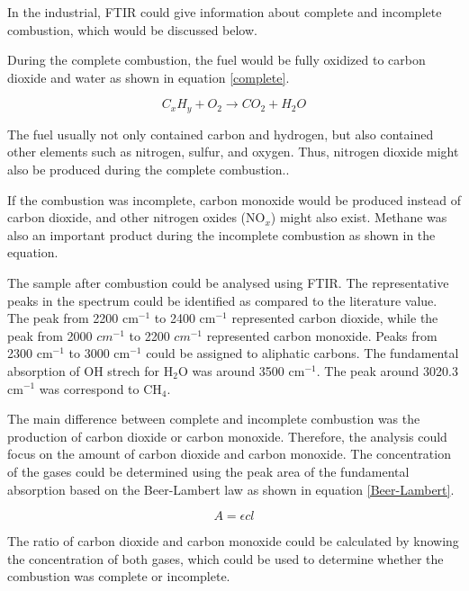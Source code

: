 \documentclass[twocolumn]{article} %
\begin{document}

In the industrial, FTIR could give information about complete and incomplete combustion, which would be discussed below. 

During the complete combustion, the fuel would be fully oxidized to carbon dioxide and water as shown in equation \ref{complete}. 

\begin{equation}
    C_xH_y + O_2 \rightarrow CO_2 + H_2O
    \label{complete}
\end{equation}

The fuel usually not only contained carbon and hydrogen, but also contained other elements such as nitrogen, sulfur, and oxygen. Thus, nitrogen dioxide might also be produced during the complete combustion.\cite{NOx}.

If the combustion was incomplete, carbon monoxide would be produced instead of carbon dioxide, and other nitrogen oxides (NO$_x$) might also exist.\cite{NOx} Methane was also an important product during the incomplete combustion as shown in the equation. \cite{PCFC}

The sample after combustion could be analysed using FTIR. The representative peaks in the spectrum could be identified as compared to the literature value. 
The peak from 2200 cm$^{-1}$ to 2400 cm$^{-1}$ represented carbon dioxide, while the peak from 2000 $cm^{-1}$ to 2200 $cm^{-1}$ represented carbon monoxide. Peaks from 2300 cm$^{-1}$ to 3000 cm$^{-1}$ could be assigned to aliphatic carbons.\cite{FTIR} The fundamental absorption of OH strech for H$_2$O was around 3500 cm$^{-1}$.\cite{H2O} The peak around 3020.3 cm$^{-1}$ was correspond to CH$_4$.\cite{Cigarette} 

The main difference between complete and incomplete combustion was the production of carbon dioxide or carbon monoxide. Therefore, the analysis could focus on the amount of carbon dioxide and carbon monoxide. The concentration of the gases could be determined using the peak area of the fundamental absorption based on the Beer-Lambert law as shown in equation \ref{Beer-Lambert}.\cite{beer}

\begin{equation}
    A = \epsilon cl
    \label{Beer-Lambert}
\end{equation}

The ratio of carbon dioxide and carbon monoxide could be calculated by knowing the concentration of both gases, which could be used to determine whether the combustion was complete or incomplete.
\end{document}
